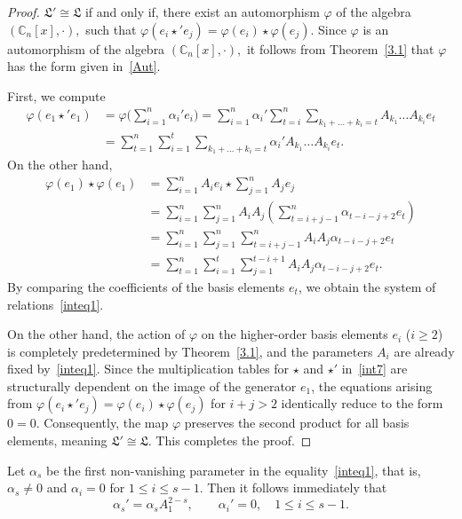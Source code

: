 \documentclass{jonasart}
\begin{document}
	\begin{proof}
		$\mathfrak{L}' \cong \mathfrak{L}$ if and only if, there exist an automorphism $\varphi$ of the algebra $(\mathbb{C}_n [x],\cdot),$ such that $\varphi(e_i \star' e_j ) = \varphi(e_i )\star \varphi(e_j ).$
		Since $\varphi$ is an automorphism of the algebra $(\mathbb{C}_n [x],\cdot),$ it follows from Theorem~\ref{3.1} that $\varphi$ has the form given in~\eqref{Aut}.

		First, we compute
		\begin{align*}
			\varphi(e_1 \star' e_1 ) 
            &= \varphi\Big(\sum_{i=1}^{n}\alpha_{i}'e_i\Big)
            =\sum_{i=1}^{n} \alpha_i '\sum_{t=i}^{n}\sum_{k_1 +\dots +k_i =t} A_{k_1}\dots A_{k_i}e_t \\
			&= \sum_{t=1}^{n} \sum_{i=1}^{t} \sum_{k_1 +\dots +k_i =t}\alpha_i ' A_{k_1} \dots A_{k_i}e_t.
		\end{align*}
		On the other hand,
        \begin{align*}
            \varphi(e_1) \star \varphi(e_1 )
            &= \sum_{i=1}^n A_i e_i \star \sum_{j=1}^n A_j e_j \\
            &= \sum_{i=1}^n \sum_{j=1}^n A_i A_j \left( \sum_{t=i+j-1}^{n} \alpha_{t-i-j+2} e_t \right) \\
            &= \sum_{i=1}^n \sum_{j=1}^n \sum_{t=i+j-1}^{n} A_i A_j \alpha_{t-i-j+2} e_t \\
            &= \sum_{t=1}^{n}\sum_{i=1}^{t} \sum_{j=1}^{t-i+1} A_i A_j \alpha_{t-i-j+2} e_t.
        \end{align*}
		By comparing the coefficients of the basis elements $e_t$, we obtain the system of relations~\eqref{inteq1}.

		On the other hand, the action of $\varphi$ on the higher-order basis elements $e_i$ ($i \geq 2$) is completely predetermined by Theorem~\ref{3.1}, and the parameters $A_i$ are already fixed by~\eqref{inteq1}. Since the multiplication tables for $\star$ and $\star'$ in~\eqref{int7} are structurally dependent on the image of the generator $e_1$, the equations arising from $\varphi(e_i \star' e_j ) = \varphi(e_i ) \star \varphi(e_j )$ for $i+j > 2$ identically reduce to the form $0=0$. Consequently, the map $\varphi$ preserves the second product for all basis elements, meaning $\mathfrak{L}' \cong \mathfrak{L}$. This completes the proof.
	\end{proof}

	Let $\alpha_s$ be the first non-vanishing parameter in the equality~\eqref{inteq1}, that is, $\alpha_s\neq 0$ and $\alpha_{i}=0$ for $1 \leq i \leq s-1.$ Then it follows immediately that
	\begin{equation}\label{alpha_s}
		\alpha_{s}'=\alpha_{s}A_1^{2-s}, \qquad \alpha_{i}'=0, \quad 1 \leq i \leq s-1.
	\end{equation}
\end{document}
